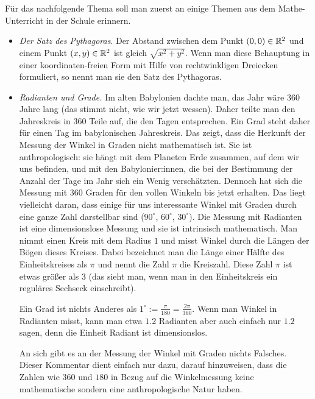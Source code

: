 \begin{bem} 
	Für das nachfolgende Thema soll man zuerst an einige Themen aus dem Mathe-Unterricht in der Schule erinnern. 
	\begin{itemize}
		\item \emph{Der Satz des Pythagoras}. Der Abstand zwischen dem Punkt $(0,0) \in \mathbb{R}^2$ und einem Punkt $(x,y) \in \mathbb{R}^2$ ist gleich $\sqrt{x^2 + y^2}$. Wenn man diese Behauptung in einer koordinaten-freien Form mit Hilfe von rechtwinkligen Dreiecken formuliert, so nennt man sie den Satz des Pythagoras. 
		\item \emph{Radianten und Grade.} Im alten Babylonien dachte man, das Jahr wäre 360 Jahre lang (das stimmt nicht, wie wir jetzt wessen). Daher teilte man den Jahreskreis in 360 Teile auf, die den Tagen entsprechen. Ein Grad steht daher für einen Tag im babylonischen Jahreskreis. Das zeigt, dass die Herkunft der Messung der Winkel in Graden nicht mathematisch ist. Sie ist anthropologisch: sie hängt mit dem Planeten Erde zusammen, auf dem wir uns befinden, und mit den Babylonier:innen, die bei der Bestimmung der Anzahl der Tage im Jahr sich ein Wenig verschätzten. Dennoch hat sich die Messung mit 360 Graden für den vollen Winkeln bis jetzt erhalten. Das liegt vielleicht daran, dass einige für uns interessante Winkel mit Graden durch eine ganze Zahl darstellbar sind ($90^\circ$, $60^\circ$, $30^\circ$). Die Messung mit Radianten ist eine dimensionslose Messung und sie ist intrinsisch mathematisch. Man nimmt einen Kreis mit dem Radius $1$ und misst Winkel durch die Längen der Bögen dieses Kreises. Dabei bezeichnet man die Länge einer Hälfte des Einheitskreises als $\pi$ und nennt die Zahl $\pi$ die Kreiszahl. Diese Zahl $\pi$ ist etwas größer als $3$ (das sieht man, wenn man in den Einheitskreis ein reguläres Sechseck einschreibt). 
		
		Ein Grad ist nichts Anderes als $1^\circ := \frac{\pi}{180}= \frac{2\pi}{360}.$ Wenn man Winkel in Radianten misst, kann man etwa $1{.}2$ Radianten aber auch einfach nur $1{.}2$ sagen, denn die Einheit Radiant ist dimensionslos. 
		
		An sich gibt es an der Messung der Winkel mit Graden nichts Falsches. Dieser Kommentar dient einfach nur dazu, darauf hinzuweisen, dass die Zahlen wie $360$ und $180$ in Bezug auf die Winkelmessung keine mathematische sondern eine anthropologische Natur haben. 
		

\end{itemize}
\end{bem}
